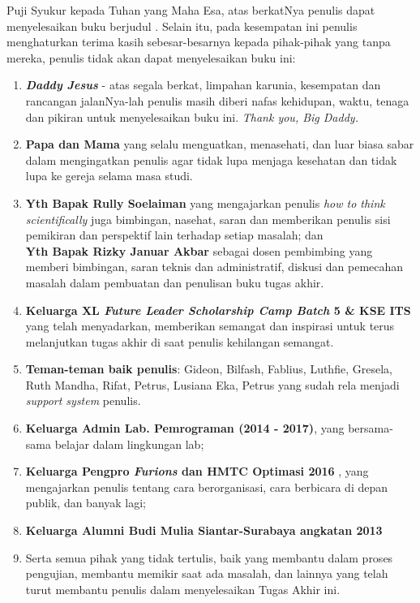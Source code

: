 	  Puji Syukur kepada Tuhan yang Maha Esa, atas berkatNya penulis dapat menyelesaikan buku berjudul \textbf{\judul}. 
	  \newline
	  \indent Selain itu, pada kesempatan ini penulis menghaturkan terima kasih sebesar-besarnya kepada pihak-pihak yang tanpa mereka, penulis tidak akan dapat menyelesaikan buku ini:
  \begin{enumerate}
  	\item \textbf{\textit{Daddy Jesus}} - atas segala berkat, limpahan karunia, kesempatan dan rancangan jalanNya-lah penulis masih diberi nafas kehidupan, waktu, tenaga dan pikiran untuk menyelesaikan buku ini. \textit{Thank you, Big Daddy.}
    \item \textbf{Papa dan Mama} yang selalu menguatkan, menasehati, dan luar biasa sabar dalam mengingatkan penulis agar tidak lupa menjaga kesehatan dan tidak lupa ke gereja selama masa studi.
    \item \textbf{Yth Bapak Rully Soelaiman} yang mengajarkan penulis \textit{how to think scientifically} juga bimbingan, nasehat, saran dan memberikan penulis sisi pemikiran dan perspektif lain terhadap setiap masalah; dan \\
	    \textbf{Yth Bapak Rizky Januar Akbar} sebagai dosen pembimbing yang memberi bimbingan, saran teknis dan administratif, diskusi dan pemecahan masalah dalam pembuatan dan penulisan buku tugas akhir.
    \item \textbf{Keluarga XL \textit{Future Leader Scholarship Camp Batch} 5 \& KSE ITS} yang telah menyadarkan, memberikan semangat dan inspirasi untuk terus melanjutkan tugas akhir di saat penulis kehilangan semangat.
    \item \textbf{Teman-teman baik penulis}: Gideon, Bilfash, Fablius, Luthfie, Gresela, Ruth Mandha, Rifat, Petrus, Lusiana Eka, Petrus yang sudah rela menjadi \textit{support system} penulis.
    \item \textbf{Keluarga Admin Lab. Pemrograman (2014 - 2017)}, yang bersama-sama belajar dalam lingkungan lab;
    \item  \textbf{Keluarga Pengpro \textit{Furions} dan HMTC Optimasi 2016 }, yang mengajarkan penulis tentang cara berorganisasi, cara berbicara di depan publik, dan banyak lagi;
    \item \textbf{Keluarga Alumni Budi Mulia Siantar-Surabaya angkatan 2013}
    \item Serta semua pihak yang tidak tertulis, baik yang membantu dalam proses pengujian, membantu memikir saat ada masalah, dan lainnya yang telah turut membantu penulis dalam menyelesaikan Tugas Akhir ini.
  \end{enumerate}
  
